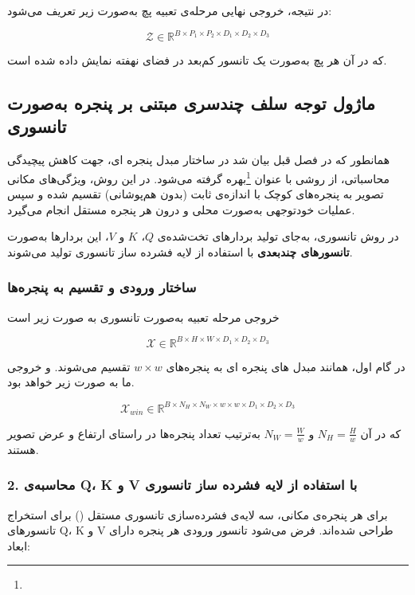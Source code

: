 در نتیجه، خروجی نهایی مرحله‌ی تعبیه پچ به‌صورت زیر تعریف می‌شود:

\[
\mathcal{Z} \in \mathbb{R}^{B \times P_1 \times P_2 \times D_1 \times D_2 \times D_3}
\]

که در آن هر پچ به‌صورت یک تانسور کم‌بعد در فضای نهفته نمایش داده شده است.


\subsection{ماژول توجه سلف چندسری مبتنی بر پنجره به‌صورت تانسوری}

همانطور که در فصل قبل بیان شد در ساختار مبدل پنجره ای، جهت کاهش پیچیدگی محاسباتی، از روشی با عنوان  \footnote{}بهره گرفته می‌شود. در این روش، ویژگی‌های مکانی تصویر به پنجره‌های کوچک با اندازه‌ی ثابت (بدون هم‌پوشانی) تقسیم شده و سپس عملیات  خود‌توجهی به‌صورت محلی و درون هر پنجره مستقل انجام می‌گیرد.

در روش تانسوری، به‌جای تولید بردارهای تخت‌شده‌ی $Q$، $K$ و $V$، این بردارها به‌صورت \textbf{تانسورهای چندبعدی} با استفاده از لایه فشرده ساز تانسوری تولید می‌شوند.

\subsubsection*{ ساختار ورودی و تقسیم به پنجره‌ها}

خروجی مرحله تعبیه  به‌صورت تانسوری به صورت زیر است 

\[
\mathcal{X} \in \mathbb{R}^{B \times H \times W \times D_1 \times D_2 \times D_3}
\]



در گام اول، همانند مبدل های پنجره ای به پنجره‌های $w \times w$ تقسیم می‌شوند. و خروجی ما به صورت  زیر خواهد بود.

\[
\mathcal{X}_{win} \in \mathbb{R}^{B \times N_H \times N_W \times w \times w \times D_1 \times D_2 \times D_3}
\]

که در آن $N_H = \frac{H}{w}$ و $N_W = \frac{W}{w}$ به‌ترتیب تعداد پنجره‌ها در راستای ارتفاع و عرض تصویر هستند.

\subsubsection*{2. محاسبه‌ی Q، K و V با استفاده از لایه فشرده ساز تانسوری}

برای هر پنجره‌ی مکانی، سه لایه‌ی فشرده‌سازی تانسوری مستقل () برای استخراج تانسورهای Q، K و V طراحی شده‌اند. فرض می‌شود تانسور ورودی هر پنجره دارای ابعاد:

